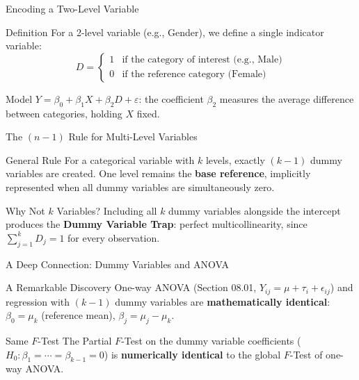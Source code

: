 \documentclass[10pt, aspectratio=169]{beamer}
\begin{document}
\begin{frame}{Encoding a Two-Level Variable}
  \footnotesize
  \begin{block}{Definition}
    For a 2-level variable (e.g., Gender), we define a single indicator variable:
    $$D=\begin{cases}1 & \text{if the category of interest (e.g., Male)}\\0 & \text{if the reference category (Female)}\end{cases}$$
  \end{block}
  \pause

  \vspace{0.1cm}
  \begin{alertblock}{Model}
    $Y=\beta_0+\beta_1X+\beta_2D+\varepsilon$: the coefficient $\beta_2$ measures the average difference between categories, holding $X$ fixed.
  \end{alertblock}
\end{frame}

\begin{frame}{The $(n-1)$ Rule for Multi-Level Variables}
  \footnotesize
  \begin{block}{General Rule}
    For a categorical variable with $k$ levels, exactly $(k-1)$ dummy variables are created. One level remains the \textbf{base reference}, implicitly represented when all dummy variables are simultaneously zero.
  \end{block}
  \pause

  \vspace{0.1cm}
  \begin{alertblock}{Why Not $k$ Variables?}
    Including all $k$ dummy variables alongside the intercept produces the \textbf{Dummy Variable Trap}: perfect multicollinearity, since $\sum_{j=1}^kD_j=1$ for every observation.
  \end{alertblock}
\end{frame}

\begin{frame}{A Deep Connection: Dummy Variables and ANOVA}
  \footnotesize
  \begin{block}{A Remarkable Discovery}
    One-way ANOVA (Section 08.01, $Y_{ij}=\mu+\tau_i+\epsilon_{ij}$) and regression with $(k-1)$ dummy variables are \textbf{mathematically identical}: $\beta_0=\mu_k$ (reference mean), $\beta_j=\mu_j-\mu_k$.
  \end{block}
  \pause

  \vspace{0.1cm}
  \begin{alertblock}{Same $F$-Test}
    The Partial $F$-Test on the dummy variable coefficients ($H_0:\beta_1=\cdots=\beta_{k-1}=0$) is \textbf{numerically identical} to the global $F$-Test of one-way ANOVA.
  \end{alertblock}
\end{frame}
\end{document}
